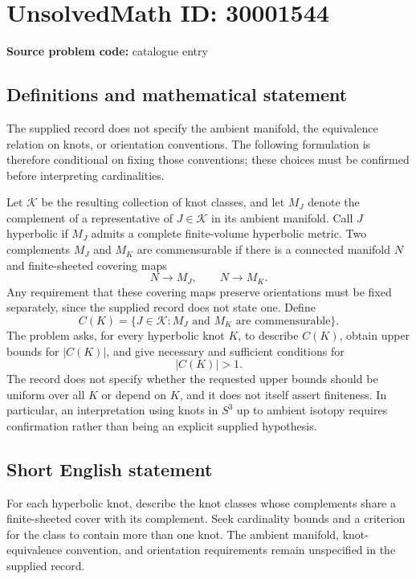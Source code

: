 \documentclass[11pt]{article}
\begin{document}
\section*{UnsolvedMath ID: 30001544}
\textbf{Source problem code:} catalogue entry
\subsection{Definitions and mathematical statement}
The supplied record does not specify the ambient manifold, the equivalence relation on knots, or orientation conventions. The following formulation is therefore conditional on fixing those conventions; these choices must be confirmed before interpreting cardinalities.

Let \(\mathcal K\) be the resulting collection of knot classes, and let \(M_J\) denote the complement of a representative of \(J\in\mathcal K\) in its ambient manifold. Call \(J\) hyperbolic if \(M_J\) admits a complete finite-volume hyperbolic metric. Two complements \(M_J\) and \(M_K\) are commensurable if there is a connected manifold \(N\) and finite-sheeted covering maps
\[
N\longrightarrow M_J,
\qquad
N\longrightarrow M_K.
\]
Any requirement that these covering maps preserve orientations must be fixed separately, since the supplied record does not state one. Define
\[
C(K)=\bigl\{J\in\mathcal K: M_J\text{ and }M_K\text{ are commensurable}\bigr\}.
\]
The problem asks, for every hyperbolic knot \(K\), to describe \(C(K)\), obtain upper bounds for \(\lvert C(K)\rvert\), and give necessary and sufficient conditions for
\[
\lvert C(K)\rvert>1.
\]
The record does not specify whether the requested upper bounds should be uniform over all \(K\) or depend on \(K\), and it does not itself assert finiteness. In particular, an interpretation using knots in \(S^3\) up to ambient isotopy requires confirmation rather than being an explicit supplied hypothesis.
\subsection{Short English statement}
For each hyperbolic knot, describe the knot classes whose complements share a finite-sheeted cover with its complement. Seek cardinality bounds and a criterion for the class to contain more than one knot. The ambient manifold, knot-equivalence convention, and orientation requirements remain unspecified in the supplied record.
\end{document}
